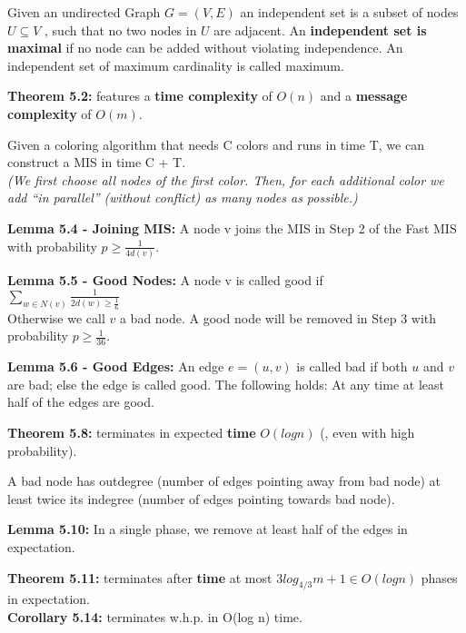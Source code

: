 {
	Given an undirected Graph $G = (V, E)$ an independent set is a subset of nodes
	$U \subseteq V$ , such that no two nodes in $U$ are adjacent. An
	{\bf independent set is maximal} if no node can be added without violating
	independence. An independent set of maximum cardinality is called maximum.
}

{
	\begin{items}
		\item {\bf Theorem 5.2:} features a {\bf time complexity} of $O(n)$ and
		a {\bf message complexity} of $O(m)$.
	\end{items}
}

{
	Given a coloring algorithm that needs C colors and runs in time T, we can
	construct a MIS in time C + T.\\
	{\it (We first choose all nodes of the first color. Then, for each additional
	color we add ``in parallel'' (without conflict) as many nodes as possible.)}
}

{
	\begin{items}
		\item {\bf Lemma 5.4 - Joining MIS:} A node v joins the MIS in Step 2 of the
		Fast MIS with probability $p \geq \frac{1}{4d(v)}$.
		\item {\bf Lemma 5.5 - Good Nodes:} A node v is called good if\\
		$\sum_{w\in N(v)} \frac{1}{2d(w) \geq \frac{1}{6}}$\\
		Otherwise we call $v$ a bad node. A good node will be removed in Step 3 with
		probability $p \geq \frac{1}{36}$.
		\item {\bf Lemma 5.6 - Good Edges:} An edge $e = (u, v)$ is called bad if both
		$u$ and $v$ are bad; else the edge is called good. The following holds: At any
		time at least half of the edges are good.
		\item {\bf Theorem 5.8:} terminates in expected {\bf time} $O(log n)$ (, even
		with high probability).
	\end{items}	
}

{
	A bad node has outdegree (number of edges pointing away from bad node) at least
	twice its indegree (number of edges pointing towards bad node).
}

{
	\begin{items}
		\item {\bf Lemma 5.10:} In a single phase, we remove at least half of the
		edges in expectation.
		\item {\bf Theorem 5.11:} terminates after {\bf time} at most $3 log_{4/3} m +
		1 \in O(log n)$ phases in expectation.\\
		{\bf Corollary 5.14:} terminates w.h.p. in O(log n) time.
	\end{items}
}

